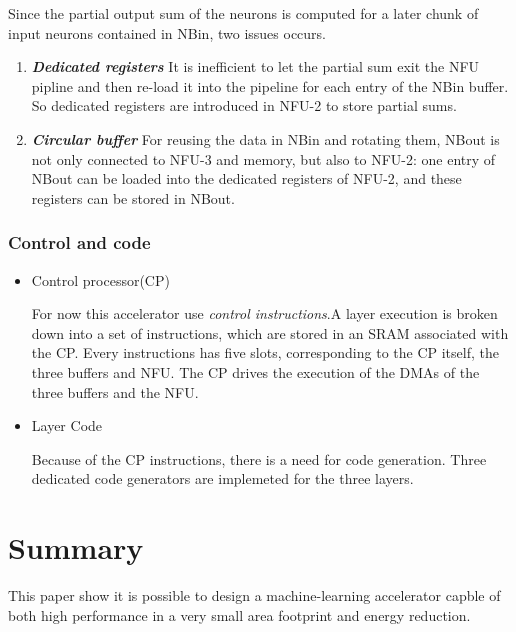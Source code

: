 \documentclass[10pt]{article}
\begin{document}
\begin{itemize}
        Since the partial output sum of the neurons is computed for a later
        chunk of input neurons contained in NBin, two issues occurs.
        \begin{enumerate}
            \item \textbf{\emph{Dedicated registers}}
            It is inefficient to let the partial sum exit the NFU pipline 
            and then re-load it into the pipeline for each entry of the NBin 
            buffer. So dedicated registers are introduced in NFU-2 to store
            partial sums.
            \item \textbf{\emph{Circular buffer}}
            For reusing the data in NBin and rotating them, NBout is not
            only connected to NFU-3 and memory, but also to NFU-2: one entry
            of NBout can be loaded into the dedicated registers of NFU-2, and
            these registers can be stored in NBout. 
        \end{enumerate}
    \end{itemize}
    \section{Control and code}
    \begin{itemize}
        \item Control processor(CP)

        For now this accelerator use \emph{control instructions}.A layer
        execution is broken down into a set of instructions, which are stored
        in an SRAM associated with the CP. Every instructions has five slots,
        corresponding to the CP itself, the three buffers and NFU. The CP 
        drives the execution of the DMAs of the three buffers and the NFU.
        \item Layer Code

        Because of the CP instructions, there is a need for code generation.
        Three dedicated code generators are implemeted for the three layers.
    \end{itemize}
    \part{Summary}

    This paper show it is possible to design a machine-learning accelerator 
    capble of both high performance in a very small area footprint and energy
    reduction.
\end{document}
